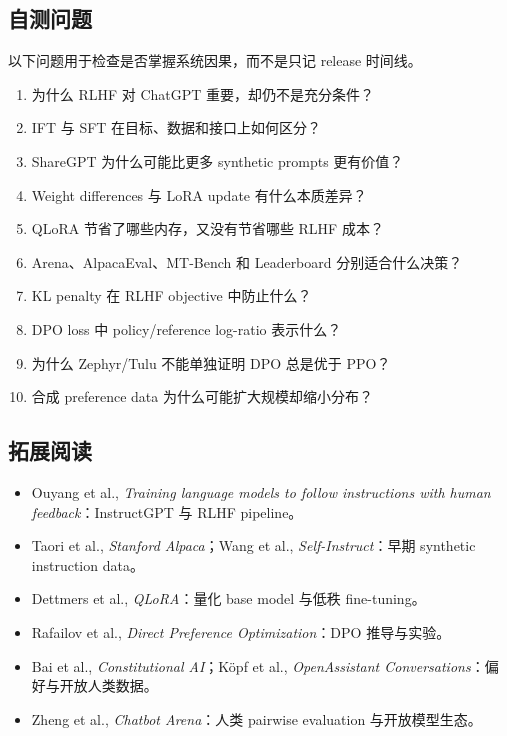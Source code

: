 \subsection{自测问题}

以下问题用于检查是否掌握系统因果，而不是只记 release 时间线。

\begin{enumerate}
  \item 为什么 RLHF 对 ChatGPT 重要，却仍不是充分条件？
  \item IFT 与 SFT 在目标、数据和接口上如何区分？
  \item ShareGPT 为什么可能比更多 synthetic prompts 更有价值？
  \item Weight differences 与 LoRA update 有什么本质差异？
  \item QLoRA 节省了哪些内存，又没有节省哪些 RLHF 成本？
  \item Arena、AlpacaEval、MT-Bench 和 Leaderboard 分别适合什么决策？
  \item KL penalty 在 RLHF objective 中防止什么？
  \item DPO loss 中 policy/reference log-ratio 表示什么？
  \item 为什么 Zephyr/Tulu 不能单独证明 DPO 总是优于 PPO？
  \item 合成 preference data 为什么可能扩大规模却缩小分布？
\end{enumerate}

\subsection{拓展阅读}

\begin{itemize}
  \item Ouyang et al., \emph{Training language models to follow instructions with human feedback}：InstructGPT 与 RLHF pipeline。
  \item Taori et al., \emph{Stanford Alpaca}；Wang et al., \emph{Self-Instruct}：早期 synthetic instruction data。
  \item Dettmers et al., \emph{QLoRA}：量化 base model 与低秩 fine-tuning。
  \item Rafailov et al., \emph{Direct Preference Optimization}：DPO 推导与实验。
  \item Bai et al., \emph{Constitutional AI}；Köpf et al., \emph{OpenAssistant Conversations}：偏好与开放人类数据。
  \item Zheng et al., \emph{Chatbot Arena}：人类 pairwise evaluation 与开放模型生态。
\end{itemize}


